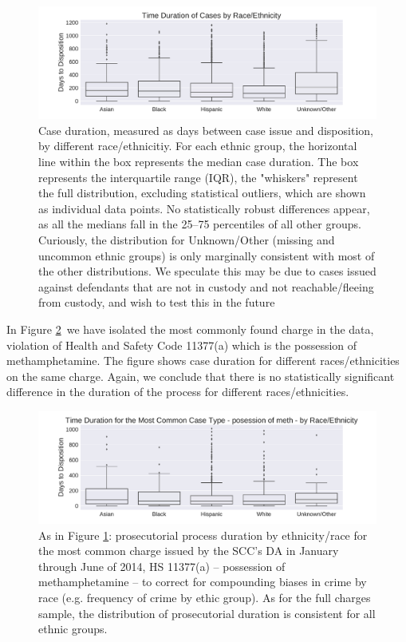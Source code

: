 \documentclass{AISB2008}
\begin{document}
\begin{figure}[h!]
\begin{center}
\includegraphics[width=0.70\columnwidth]{figures/race_boxplot/race_boxplot}
\caption{Case duration, measured as days between case issue and disposition, by different race/ethnicitiy. For each ethnic group, the horizontal line within the box represents the median case duration. The box represents the interquartile range (IQR), the "whiskers" represent the full distribution, excluding statistical outliers, which are shown as individual data points. No statistically robust differences appear, as all the medians fall in the 25--75 percentiles of all other groups. Curiously, the distribution for Unknown/Other (missing and uncommon ethnic groups) is only marginally consistent with most of the other distributions. We speculate this may be due to cases issued against defendants that are not in custody and not reachable/fleeing from custody, and wish to test this in the future
\label{fig:DurationsEthnicity}%
}
\end{center}
\end{figure}

In Figure \ref{fig:DurationsMeth}~we have isolated the most commonly
found charge in the data, violation of Health and Safety Code 11377(a)
which is the possession of methamphetamine. The figure shows case
duration for different races/ethnicities on the same charge. Again, we
conclude that there is no statistically significant difference in the
duration of the process for different races/ethnicities.

\begin{figure}[h!]
\begin{center}
\includegraphics[width=0.70\columnwidth]{figures/race_modalcrime_boxplot/boxplot_race_modalcrime}
\caption{As in Figure \ref{fig:DurationsEthnicity}: prosecutorial process duration by ethnicity/race for the most common charge issued by the SCC's DA in January through June of 2014, HS 11377(a) -- possession of methamphetamine -- to correct for compounding biases in crime by race (e.g. frequency of crime by ethic group). As for the full charges sample, the distribution of prosecutorial duration is consistent for all ethnic groups.
\label{fig:DurationsMeth}%
}
\end{center}
\end{figure}
\end{document}
